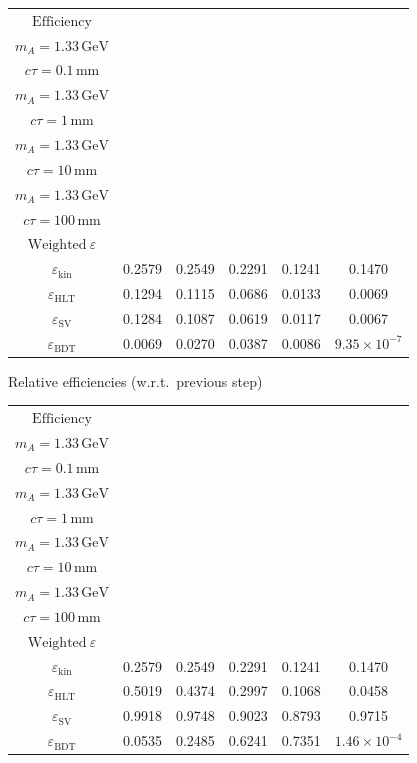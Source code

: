 \documentclass[10pt,a4paper]{article}
\begin{document}
{\begin{tabular}{cccccc}
\toprule
$\mathrm{Efficiency}$ & \shortstack{$m_{\pi}=4\,\mathrm{GeV}$\\$m_{A}=1.33\,\mathrm{GeV}$\\$c\tau=0.1\,\mathrm{mm}$} & \shortstack{$m_{\pi}=4\,\mathrm{GeV}$\\$m_{A}=1.33\,\mathrm{GeV}$\\$c\tau=1\,\mathrm{mm}$} & \shortstack{$m_{\pi}=4\,\mathrm{GeV}$\\$m_{A}=1.33\,\mathrm{GeV}$\\$c\tau=10\,\mathrm{mm}$} & \shortstack{$m_{\pi}=4\,\mathrm{GeV}$\\$m_{A}=1.33\,\mathrm{GeV}$\\$c\tau=100\,\mathrm{mm}$} & \shortstack{$\mathrm{QCD}$\\$\mathrm{Weighted}\ \varepsilon$} \\
\midrule
$\varepsilon_{\mathrm{kin}}$ & 0.2579 & 0.2549 & 0.2291 & 0.1241 & 0.1470\\
$\varepsilon_{\mathrm{HLT}}$ & 0.1294 & 0.1115 & 0.0686 & 0.0133 & 0.0069\\
$\varepsilon_{\mathrm{SV}}$ & 0.1284 & 0.1087 & 0.0619 & 0.0117 & 0.0067\\
$\varepsilon_{\mathrm{BDT}}$ & 0.0069 & 0.0270 & 0.0387 & 0.0086 & $9.35\times10^{-7}$\\
\bottomrule
\end{tabular}

\vspace{18pt}

Relative efficiencies (w.r.t.\ previous step)

\begin{tabular}{cccccc}
\toprule
$\mathrm{Efficiency}$ & \shortstack{$m_{\pi}=4\,\mathrm{GeV}$\\$m_{A}=1.33\,\mathrm{GeV}$\\$c\tau=0.1\,\mathrm{mm}$} & \shortstack{$m_{\pi}=4\,\mathrm{GeV}$\\$m_{A}=1.33\,\mathrm{GeV}$\\$c\tau=1\,\mathrm{mm}$} & \shortstack{$m_{\pi}=4\,\mathrm{GeV}$\\$m_{A}=1.33\,\mathrm{GeV}$\\$c\tau=10\,\mathrm{mm}$} & \shortstack{$m_{\pi}=4\,\mathrm{GeV}$\\$m_{A}=1.33\,\mathrm{GeV}$\\$c\tau=100\,\mathrm{mm}$} & \shortstack{$\mathrm{QCD}$\\$\mathrm{Weighted}\ \varepsilon$} \\
\midrule
$\varepsilon_{\mathrm{kin}}$ & 0.2579 & 0.2549 & 0.2291 & 0.1241 & 0.1470\\
$\varepsilon_{\mathrm{HLT}}$ & 0.5019 & 0.4374 & 0.2997 & 0.1068 & 0.0458\\
$\varepsilon_{\mathrm{SV}}$ & 0.9918 & 0.9748 & 0.9023 & 0.8793 & 0.9715\\
$\varepsilon_{\mathrm{BDT}}$ & 0.0535 & 0.2485 & 0.6241 & 0.7351 & $1.46\times10^{-4}$\\
\bottomrule
\end{tabular}

}
\end{document}
